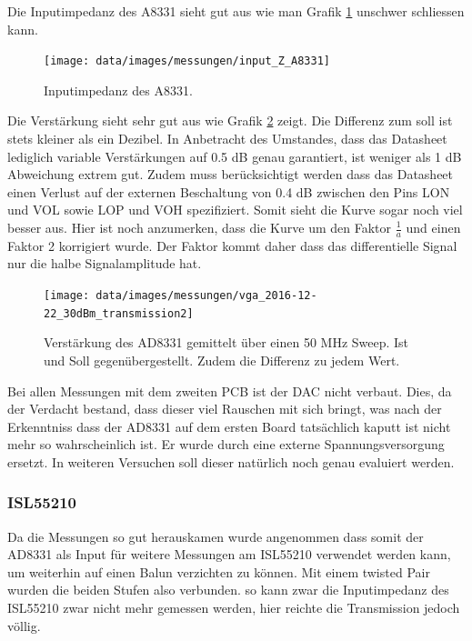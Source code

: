 Die Inputimpedanz des A8331 sieht gut aus wie man Grafik \ref{fig:Z_in_A8331} unschwer schliessen kann.

\begin{figure}[H]
\begin{center}
    \texttt{[image: data/images/messungen/input\_Z\_A8331]}
    \caption{Inputimpedanz des A8331.}
    \label{fig:Z_in_A8331}
\end{center}
\end{figure}

Die Verstärkung sieht sehr gut aus wie Grafik \ref{fig:T_A8331} zeigt. Die Differenz zum soll ist stets kleiner als ein Dezibel. In Anbetracht des Umstandes, dass das Datasheet lediglich variable Verstärkungen auf 0.5 dB genau garantiert, ist weniger als 1 dB Abweichung extrem gut. Zudem muss berücksichtigt werden dass das Datasheet einen Verlust auf der externen Beschaltung von 0.4 dB zwischen den Pins LON und VOL sowie LOP und VOH spezifiziert.
Somit sieht die Kurve sogar noch viel besser aus.
Hier ist noch anzumerken, dass die Kurve um den Faktor $\frac{1}{a}$ und einen Faktor 2 korrigiert wurde. Der Faktor kommt daher dass das differentielle Signal nur die halbe Signalamplitude hat. 

\begin{figure}[H]
\begin{center}
    \texttt{[image: data/images/messungen/vga\_2016-12-22\_30dBm\_transmission2]}
    \caption{Verstärkung des AD8331 gemittelt über einen 50 MHz Sweep. Ist und Soll gegenübergestellt. Zudem die Differenz zu jedem Wert.}
    \label{fig:T_A8331}
\end{center}
\end{figure}

Bei allen Messungen mit dem zweiten PCB ist der DAC nicht verbaut. Dies, da der Verdacht bestand, dass dieser viel Rauschen mit sich bringt, was nach der Erkenntniss dass der AD8331 auf dem ersten Board tatsächlich kaputt ist nicht mehr so wahrscheinlich ist. Er wurde durch eine externe Spannungsversorgung ersetzt. In weiteren Versuchen soll dieser natürlich noch genau evaluiert werden.

\subsubsection*{ISL55210}

Da die Messungen so gut herauskamen wurde angenommen dass somit der AD8331 als Input für weitere Messungen am ISL55210 verwendet werden kann, um weiterhin auf einen Balun verzichten zu können. Mit einem twisted Pair wurden die beiden Stufen also verbunden. so kann zwar die Inputimpedanz des ISL55210 zwar nicht mehr gemessen werden, hier reichte die Transmission jedoch völlig.

